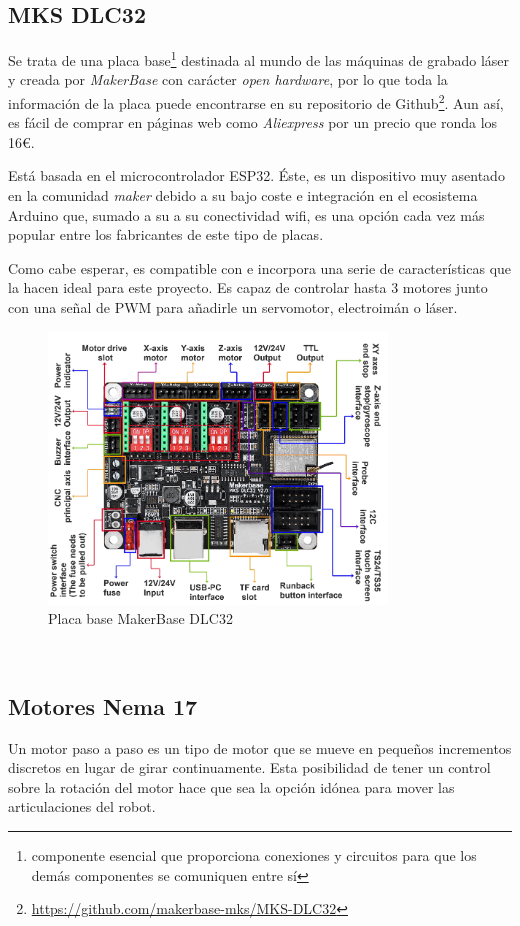\subsection{MKS DLC32}
\label{subsec:mksdlc32}
\noindent Se trata de una placa base\footnote{componente esencial que proporciona conexiones y circuitos para que los demás componentes se comuniquen entre sí} destinada al mundo de las máquinas de grabado láser y creada por \textit{MakerBase} con carácter \textit{open hardware}, por lo que toda la información de la placa 
puede encontrarse en su repositorio de Github\footnote{\url{https://github.com/makerbase-mks/MKS-DLC32}}. Aun así, es fácil de comprar 
en páginas web como \textit{Aliexpress} por un precio que ronda los 16\euro. 

Está basada en el 
microcontrolador ESP32. Éste, es un dispositivo muy asentado en la comunidad \textit{maker} debido a su bajo coste e integración en el 
ecosistema Arduino que, sumado a su a su conectividad wifi, es una opción cada vez más popular entre los fabricantes de este tipo de placas.

Como cabe esperar, es compatible con  e incorpora una serie de características que la hacen ideal para este proyecto. Es capaz de 
controlar hasta 3 motores junto con una señal de \ac{PWM} para añadirle un servomotor, electroimán o láser.
\begin{figure} [h!]
    \begin{center}
      \includegraphics[width=9cm]{figs/MKS.png}
    \end{center}
    \caption{Placa base MakerBase DLC32}
    \label{fig:robSoldering}
  \end{figure}\ 

\subsection{Motores Nema 17}
\label{subsec:motores}
\noindent Un motor paso a paso es un tipo de motor que se mueve en pequeños incrementos discretos en lugar de girar continuamente. Esta  
posibilidad de tener un control sobre la rotación del motor hace que sea la opción idónea para mover las articulaciones del robot.

